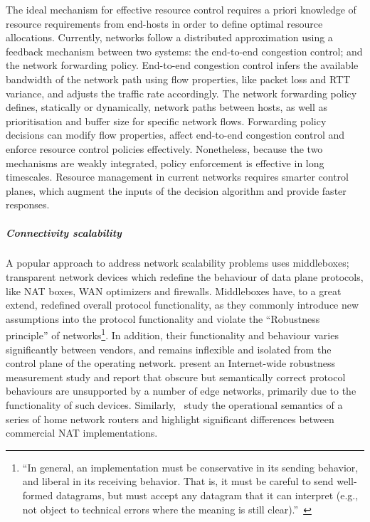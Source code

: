 The ideal mechanism for effective resource control requires a priori knowledge
of resource requirements from end-hosts in order to define optimal resource
allocations.  Currently, networks follow a distributed approximation using a
feedback mechanism between two systems: the end-to-end congestion control; and
the network forwarding policy.  End-to-end congestion control infers the
available bandwidth of the network path using flow properties, like packet loss
and RTT variance, and adjusts the traffic rate accordingly. The network
forwarding policy defines, statically or dynamically, network paths between
hosts, as well as prioritisation and buffer size for specific network flows.
Forwarding policy decisions can modify flow properties, affect end-to-end
congestion control and enforce resource control policies effectively.
Nonetheless, because the two mechanisms are weakly integrated, policy
enforcement is effective in long timescales.  Resource management in current
networks requires smarter control planes, which augment the inputs of the
decision algorithm and provide faster responses.

\subparagraph*{Connectivity scalability} 

A popular approach to address network scalability problems uses middleboxes;
transparent network devices which redefine the behaviour of data plane
protocols, like NAT boxes, WAN optimizers and firewalls.  Middleboxes have,
 to a great extend, redefined overall protocol functionality, as they commonly
introduce new assumptions into the protocol functionality and violate the
``Robustness principle'' of networks\footnote{``In general, an implementation must
be conservative in its sending behavior, and liberal in its receiving behavior.
That is, it must be careful to send well-formed datagrams, but must accept any
datagram that it can interpret (e.g., not object to technical errors where the
meaning is still clear).''~}. In addition, their functionality
and behaviour varies significantly between vendors, and remains inflexible and
isolated from the control plane of the operating network. 
present an Internet-wide robustness measurement study and report that obscure
but semantically correct protocol behaviours are unsupported by a number of
edge networks, primarily due to the functionality of such devices.
Similarly,~ study the operational semantics of a series of
home network routers and highlight significant differences between commercial NAT
implementations. 

